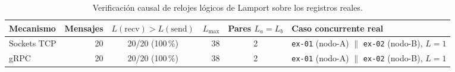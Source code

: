 \begin{table}[htbp]
\centering
\caption{Verificación causal de relojes lógicos de Lamport sobre los registros reales.}
\label{tab:verificacion_lamport}
\footnotesize
\begin{tabular}{lrcrcl}
\toprule
Mecanismo & Mensajes & $L(\mathrm{recv}) > L(\mathrm{send})$ & $L_{\max}$ & Pares $L_a=L_b$ & Caso concurrente real \\
\midrule
Sockets TCP & 20 & 20/20 (100\,\%) & 38 & 2 & \texttt{ex-01} (nodo-A) $\parallel$ \texttt{ex-02} (nodo-B), $L=1$ \\
gRPC & 20 & 20/20 (100\,\%) & 38 & 2 & \texttt{ex-01} (nodo-A) $\parallel$ \texttt{ex-02} (nodo-B), $L=1$ \\
\bottomrule
\end{tabular}
\end{table}
